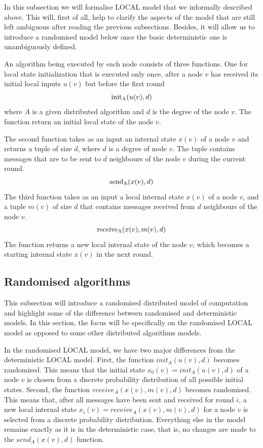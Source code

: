 In this subsection we will formalise LOCAL model that we informally described above.
This will, first of all, help to clarify the aspects of the model that are still left ambiguous
after reading the previous subsections. Besides, it will allow us to introduce
a randomised model below once the basic deterministic one is unambiguously defined.

An algorithm being executed by each node consists of 
three functions. One for local state initialization that is executed only once, after
a node $v$ has received its initial local inputs $u(v)$ but before the first round
$$\init_A(u(v), d)$$
where $A$ is a given distributed algorithm and $d$ is the degree of the node $v$.
The function return an initial local state of the node $v$.

The second function takes as an input an internal state $x(v)$ of a node $v$
and returns a tuple of size $d$, where $d$ is a degree of node $v$. The
tuple contains messages that are to be sent to $d$ neighbours of the node $v$
during the current round.
$$\send_A(x(v), d)$$
The third function takes as an input a local internal state $x(v)$ of a node
$v$, and a tuple $m(v)$ of size $d$ that contains messages received from $d$ neighbours
of the node $v$.
$$\receive_A(x(v), m(v), d)$$
The function returns a new local internal state of the node $v$, which becomes a
starting internal state $x(v)$ in the next round.

\subsection{Randomised algorithms}

This subsection will introduce a randomised distributed model of computation
and highlight some of the difference between randomised and deterministic
models. In this section, the focus will be specifically on the randomised LOCAL
model as opposed to some other distributed algorithms models.

In the randomised LOCAL model, we have two major differences from the
deterministic LOCAL model. First, the function $init_A(u(v), d)$ becomes
randomised. This means that the initial state $x_0(v) = init_A(u(v), d)$ of a node $v$ is
chosen from a discrete probability distribution of all possible initial states.
Second, the function $receive_A(x(v), m(v), d)$ becomes randomised. This means that,
after all messages have been sent and received for round $i$, a new local internal
state $x_i(v) = receive_A(x(v), m(v), d)$ for a node $v$ is selected from a
discrete probability distribution. Everything else in the model remains exactly
as it is in the deterministic case, that is, no changes are made to the $send_A(x(v), d)$
function.

